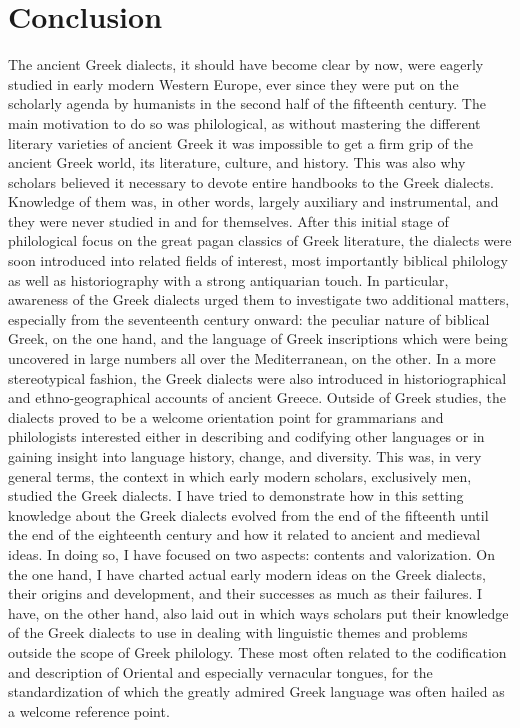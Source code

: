 \section{Conclusion} %
\hypertarget{Toc19704869}{}
The ancient Greek dialects, it should have become clear by now, were eagerly studied in early modern Western Europe, ever since they were put on the scholarly agenda by humanists in the second half of the fifteenth century. The main motivation to do so was philological, as without mastering the different literary varieties of ancient Greek it was impossible to get a firm grip of the ancient Greek world, its literature, culture, and history. This was also why scholars believed it necessary to devote entire handbooks to the Greek dialects. Knowledge of them was, in other words, largely auxiliary and instrumental, and they were never studied in and for themselves. After this initial stage of philological focus on the great pagan classics of Greek literature, the dialects were soon introduced into related fields of interest, most importantly biblical philology as well as historiography with a strong antiquarian touch. In particular, awareness of the Greek dialects urged them to investigate two additional matters, especially from the seventeenth century onward: the peculiar nature of biblical Greek, on the one hand, and the language of Greek inscriptions which were being uncovered in large numbers all over the Mediterranean, on the other. In a more stereotypical fashion, the Greek dialects were also introduced in historiographical and ethno-geographical accounts of ancient Greece. Outside of Greek studies, the dialects proved to be a welcome orientation point for grammarians and philologists interested either in describing and codifying other languages or in gaining insight into language history, change, and diversity. This was, in very general terms, the context in which early modern scholars, exclusively men, studied the Greek dialects. I have tried to demonstrate how in this setting knowledge about the Greek dialects evolved from the end of the fifteenth until the end of the eighteenth century and how it related to ancient and medieval ideas. In doing so, I have focused on two aspects: contents and valorization. On the one hand, I have charted actual early modern ideas on the Greek dialects, their origins and development, and their successes as much as their failures. I have, on the other hand, also laid out in which ways scholars put their knowledge of the Greek dialects to use in dealing with linguistic themes and problems outside the scope of Greek philology. These most often related to the codification and description of Oriental and especially vernacular tongues, for the standardization of which the greatly admired Greek language was often hailed as a welcome reference point.

